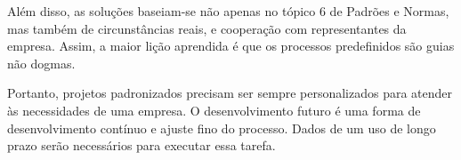 Além disso, as soluções
baseiam-se não apenas no tópico 6 de Padrões e Normas, mas também de
circunstâncias reais, e cooperação com representantes da empresa.
Assim, a maior lição aprendida é que os processos predefinidos são
guias não dogmas.

Portanto, projetos padronizados precisam ser sempre
personalizados para atender às necessidades de uma empresa.
O desenvolvimento futuro é uma forma de desenvolvimento contínuo e
ajuste fino do processo. Dados de um uso de longo prazo serão necessários
para executar essa tarefa.
